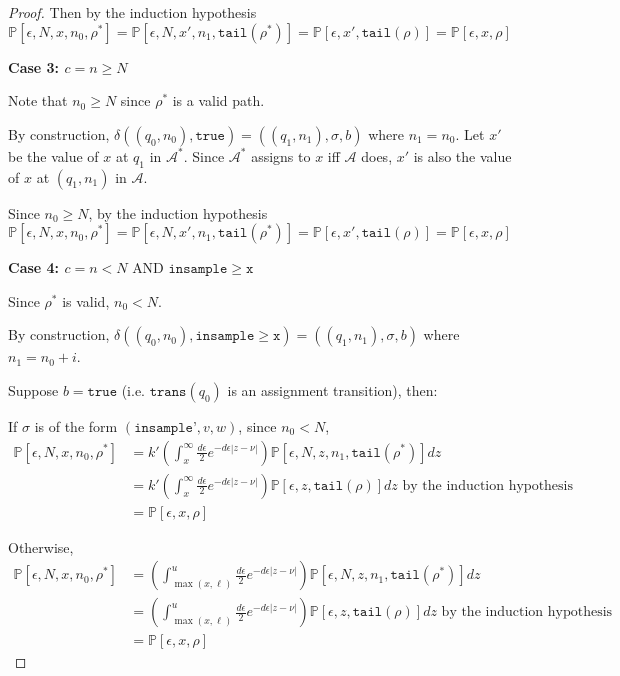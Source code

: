 \documentclass[12pt]{article}
\newcommand{\PP}{\mathbb{P}}
\newcommand{\gguard}{\texttt{insample}\geq \texttt{x}}
\newcommand{\gaguard}{n<N \text{ AND } \texttt{insample} \geq \texttt{x}}
\theoremstyle{definition}
\begin{document}
\begin{proof}
	Then by the induction hypothesis
		\[
			\PP[\epsilon, N, x, n_0, \rho^*] = \PP[\epsilon, N, x', n_1, \texttt{tail}(\rho^*)] = \PP[\epsilon, x', \texttt{tail}(\rho)] = \PP[\epsilon, x, \rho]
		\]

	\textbf{Case 3: $c = n\geq N$}

	Note that $ n_0 \geq N$ since $\rho^*$ is a valid path.
	
	By construction, $\delta((q_0, n_0), \texttt{true}) = ((q_1, n_1), \sigma, b)$ where $n_1 = n_0$. Let $x'$ be the value of $x$ at $q_1$ in $\mathcal{A}^*$. Since $\mathcal{A}^*$ assigns to $x$ iff $\mathcal{A}$ does, $x'$ is also the value of $x$ at $(q_1, n_1)$ in $\mathcal{A}$.

	Since $n_0 \geq N$, by the induction hypothesis
		\[
			\PP[\epsilon, N, x, n_0, \rho^*] = \PP[\epsilon, N, x', n_1, \texttt{tail}(\rho^*)] = \PP[\epsilon, x', \texttt{tail}(\rho)] = \PP[\epsilon, x, \rho]
		\]

	\textbf{Case 4: $c = \gaguard$}

	Since $\rho^*$ is valid, $n_0 < N$. 

	By construction, $\delta((q_0, n_0), \gguard) = ((q_1, n_1), \sigma, b)$ where $n_1 = n_0+i$. 

	Suppose $b = \texttt{true}$ (i.e. $\texttt{trans}(q_0)$ is an assignment transition), then:

	If $\sigma$ is of the form $(\texttt{insample'}, v, w)$, since $n_0 < N$, 
		\begin{align*}
			\PP[\epsilon, N, x, n_0, \rho^*] &= k'\left(\int_x^\infty\frac{d\epsilon}{2}e^{-d\epsilon|z-\nu|}\right)\PP[\epsilon, N, z, n_1, \texttt{tail}(\rho^*)]dz \\
			&= k'\left(\int_x^\infty\frac{d\epsilon}{2}e^{-d\epsilon|z-\nu|}\right)\PP[\epsilon, z, \texttt{tail}(\rho)]dz \text{ by the induction hypothesis }\\
			&= \PP[\epsilon, x, \rho]
		\end{align*}
	
	Otherwise, 
	\begin{align*}
		\PP[\epsilon, N, x, n_0, \rho^*] &= \left(\int_{\max(x, \ell)}^u\frac{d\epsilon}{2}e^{-d\epsilon|z-\nu|}\right)\PP[\epsilon, N, z, n_1, \texttt{tail}(\rho^*)]dz \\
		&= \left(\int_{\max(x, \ell)}^u\frac{d\epsilon}{2}e^{-d\epsilon|z-\nu|}\right)\PP[\epsilon, z, \texttt{tail}(\rho)]dz \text{ by the induction hypothesis }\\
		&= \PP[\epsilon, x, \rho]
	\end{align*}


\end{proof}
\end{document}
